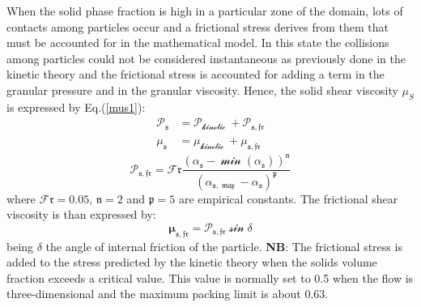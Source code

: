 \documentclass[11pt]{report}
\begin{document}
When the solid phase fraction is high in a particular zone of the domain, lots of contacts among particles occur and a frictional stress derives from them that must be accounted for in the mathematical model. 
%
In this state the collisions among particles could not be considered instantaneous as previously done in the kinetic theory and the frictional stress is accounted for adding a term in the granular pressure and in the granular viscosity. 
%
Hence, the solid shear viscosity $\mu_S$ is expressed by Eq.(\ref{mus1}):
%
\begin{equation}
\begin{aligned}
\boldsymbol{\mathcal{P_\mathfrak{{s}}}} &=\mathcal{P_{\text {kinetic }}+P_\mathfrak{{s, fr}}} \\
\boldsymbol{\mathcal{\mu_\mathfrak{{s}}}} &=\mathcal{\mu_{\text {kinetic }}+\mu_\mathfrak{{s, fr}}}
\label{mus1}
\end{aligned}
\end{equation}
%
%
\begin{equation}
\boldsymbol{\mathcal{P_\mathfrak{{s, fr}}}}=\mathcal{F}\mathfrak{r} \frac{\left(\mathcal{\alpha}_\mathfrak{s}-\mathcal{\min \left(\alpha_\mathfrak{s}\right)}\right)^\mathfrak{n}}{\mathcal{\left(\alpha_\mathfrak{s, \max }-\alpha_\mathfrak{s}\right)^\mathfrak{p}}}
\end{equation}
where  $\boldsymbol{\mathcal{F}\mathfrak{r}}=0.05$, $\boldsymbol{\mathfrak{n}}=2$ and $\boldsymbol{\mathfrak{p}}=5$ are empirical constants. The frictional shear viscosity is than expressed by:
\begin{equation}
\mathcal{\boldsymbol{\mu_\mathfrak{{s, fr}}}=P_\mathfrak{{s, fr}} \sin \delta}
\end{equation}
%
being $\mathfrak{\delta}$ the angle of internal friction of the particle.
%
{\bf NB}: The frictional stress is added to the stress predicted by the kinetic theory when the solids volume fraction exceeds a critical value. This value is normally set to 0.5 when the flow is three-dimensional and the maximum packing limit is about 0.63.
%
\end{document}
